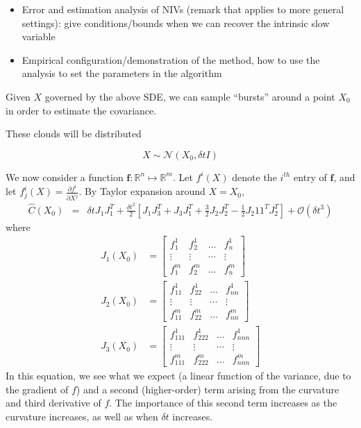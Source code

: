 \documentclass[1p]{elsarticle}
\begin{document}
\begin{itemize}
\item Error and estimation analysis of NIVs (remark that applies to more general settings): give conditions/bounds when we can recover the intrinsic slow variable
%
\item Empirical configuration/demonstration of the method, how to use the analysis to set the parameters in the algorithm
\end{itemize}

Given $X$ governed by the above SDE, we can sample ``bursts'' around a point $X_0$ in order to estimate the covariance. 

These clouds will be distributed 

\begin{equation}
X \sim \mathcal{N}\left( X_0, \delta t I \right)
\end{equation}


We now consider a function $\mathbf{f}: \mathbb{R}^n \mapsto \mathbb{R}^m$.
%
Let $f^i(X)$ denote the $i^{th}$ entry of $\mathbf{f}$, and let $f^i_j(X) = \frac{\partial f^i}{\partial X^j}$.
%
By Taylor expansion around $X=X_0$,
%
\begin{eqnarray}
\hat{C}(X_0) &=& \delta t J_1 J_1^T 
+ \frac{\delta t^2}{2} \left[ J_1 J_3^T + J_3 J_1^T  
+ \frac{3}{2} J_2 J_2^T 
-\frac{1 }{2} J_2 1 1^T J_2^T \right]
+ \mathcal{O} (\delta t^3) %
\end{eqnarray}
where
\begin{equation}
\begin{aligned}
J_1(X_0) &= \begin{bmatrix}
f_1^1 & f_2^1 & \dots & f_n^1 \\
\vdots & \vdots & \cdots & \vdots \\
f_1^m & f_2^m & \dots & f_n^m
\end{bmatrix}\\
%
J_2(X_0) &= \begin{bmatrix}
f_{11}^1 & f_{22}^1 & \dots & f_{nn}^1 \\
\vdots & \vdots & \cdots & \vdots \\
f_{11}^m & f_{22}^m & \dots & f_{nn}^m
\end{bmatrix}\\
%
J_3(X_0) &= \begin{bmatrix}
f_{111}^1 & f_{222}^1 & \dots & f_{nnn}^1 \\
\vdots & \vdots & \cdots & \vdots \\
f_{111}^m & f_{222}^m & \dots & f_{nnn}^m
\end{bmatrix}
\end{aligned}
\end{equation}
%
In this equation, we see what we expect (a linear function of the variance, due to the gradient of $f$) and a second (higher-order) term arising from the curvature and third derivative of $f$.
%
The importance of this second term increases as the curvature increases, as well as when $\delta t$ increases. 
\end{document}
